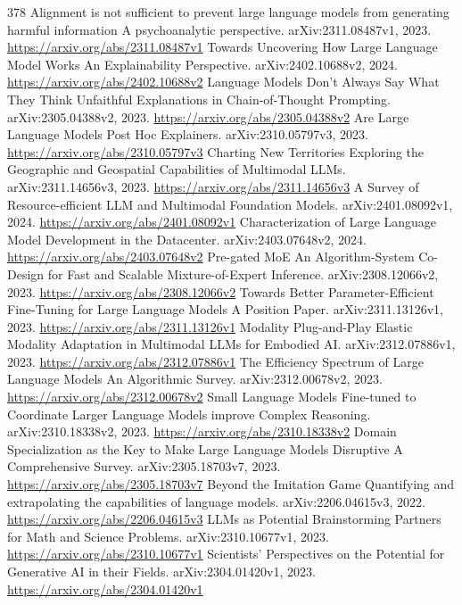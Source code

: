 \documentclass[11pt]{article}
\begin{document}
\begin{thebibliography}{378}
 Alignment is not sufficient to prevent large language models from generating harmful information A psychoanalytic perspective. arXiv:2311.08487v1, 2023. \url{https://arxiv.org/abs/2311.08487v1}
 Towards Uncovering How Large Language Model Works An Explainability Perspective. arXiv:2402.10688v2, 2024. \url{https://arxiv.org/abs/2402.10688v2}
 Language Models Don't Always Say What They Think Unfaithful Explanations in Chain-of-Thought Prompting. arXiv:2305.04388v2, 2023. \url{https://arxiv.org/abs/2305.04388v2}
 Are Large Language Models Post Hoc Explainers. arXiv:2310.05797v3, 2023. \url{https://arxiv.org/abs/2310.05797v3}
 Charting New Territories Exploring the Geographic and Geospatial Capabilities of Multimodal LLMs. arXiv:2311.14656v3, 2023. \url{https://arxiv.org/abs/2311.14656v3}
 A Survey of Resource-efficient LLM and Multimodal Foundation Models. arXiv:2401.08092v1, 2024. \url{https://arxiv.org/abs/2401.08092v1}
 Characterization of Large Language Model Development in the Datacenter. arXiv:2403.07648v2, 2024. \url{https://arxiv.org/abs/2403.07648v2}
 Pre-gated MoE An Algorithm-System Co-Design for Fast and Scalable Mixture-of-Expert Inference. arXiv:2308.12066v2, 2023. \url{https://arxiv.org/abs/2308.12066v2}
 Towards Better Parameter-Efficient Fine-Tuning for Large Language Models A Position Paper. arXiv:2311.13126v1, 2023. \url{https://arxiv.org/abs/2311.13126v1}
 Modality Plug-and-Play Elastic Modality Adaptation in Multimodal LLMs for Embodied AI. arXiv:2312.07886v1, 2023. \url{https://arxiv.org/abs/2312.07886v1}
 The Efficiency Spectrum of Large Language Models An Algorithmic Survey. arXiv:2312.00678v2, 2023. \url{https://arxiv.org/abs/2312.00678v2}
 Small Language Models Fine-tuned to Coordinate Larger Language Models improve Complex Reasoning. arXiv:2310.18338v2, 2023. \url{https://arxiv.org/abs/2310.18338v2}
 Domain Specialization as the Key to Make Large Language Models Disruptive A Comprehensive Survey. arXiv:2305.18703v7, 2023. \url{https://arxiv.org/abs/2305.18703v7}
 Beyond the Imitation Game Quantifying and extrapolating the capabilities of language models. arXiv:2206.04615v3, 2022. \url{https://arxiv.org/abs/2206.04615v3}
 LLMs as Potential Brainstorming Partners for Math and Science Problems. arXiv:2310.10677v1, 2023. \url{https://arxiv.org/abs/2310.10677v1}
 Scientists' Perspectives on the Potential for Generative AI in their Fields. arXiv:2304.01420v1, 2023. \url{https://arxiv.org/abs/2304.01420v1}

\end{thebibliography}
\end{document}
